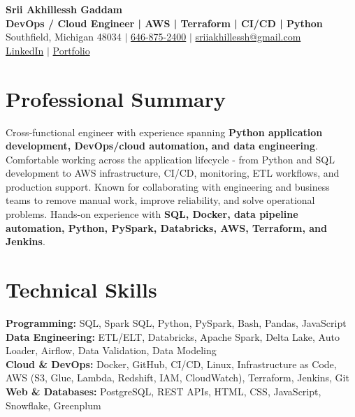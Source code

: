 \documentclass[letterpaper,10pt]{article}
\begin{document}
\fontsize{9.35pt}{10.45pt}\selectfont

\begin{center}
    {\LARGE \textbf{Srii Akhillessh Gaddam}} \\[-1pt]
    \textbf{DevOps / Cloud Engineer | AWS | Terraform | CI/CD | Python} \\[2pt]
    Southfield, Michigan 48034 $|$
    \href{tel:6468752400}{646-875-2400} $|$
    \href{mailto:sriiakhillessh@gmail.com}{sriiakhillessh@gmail.com} \\[1pt]
    \href{https://www.linkedin.com/in/srii-akhiilessh-gaddam-b48668191/}{LinkedIn} $|$
    \href{https://sriiakhillesshg.github.io/portfolio/}{Portfolio}
\end{center}
\vspace{-8pt}

\section{Professional Summary}
\small{Cross-functional engineer with experience spanning \textbf{Python application development, DevOps/cloud automation, and data engineering}. Comfortable working across the application lifecycle - from Python and SQL development to AWS infrastructure, CI/CD, monitoring, ETL workflows, and production support. Known for collaborating with engineering and business teams to remove manual work, improve reliability, and solve operational problems. Hands-on experience with \textbf{SQL, Docker, data pipeline automation, Python, PySpark, Databricks, AWS, Terraform, and Jenkins}.}

\section{Technical Skills}
\small{
\textbf{Programming:} SQL, Spark SQL, Python, PySpark, Bash, Pandas, JavaScript \\
\textbf{Data Engineering:} ETL/ELT, Databricks, Apache Spark, Delta Lake, Auto Loader, Airflow, Data Validation, Data Modeling \\
\textbf{Cloud \& DevOps:} Docker, GitHub, CI/CD, Linux, Infrastructure as Code, AWS (S3, Glue, Lambda, Redshift, IAM, CloudWatch), Terraform, Jenkins, Git \\
\textbf{Web \& Databases:} PostgreSQL, REST APIs, HTML, CSS, JavaScript, Snowflake, Greenplum
}
\end{document}
